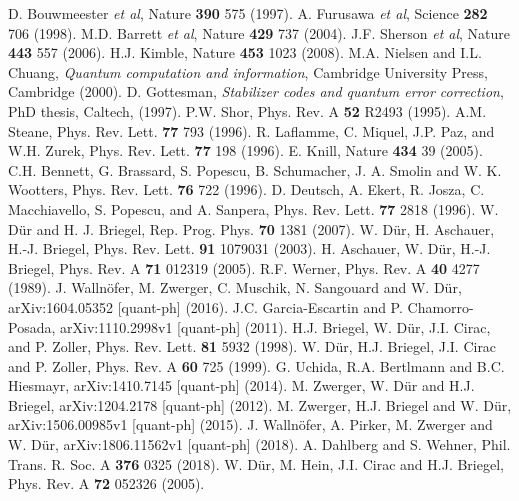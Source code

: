 \documentclass[10pt,a4paper]{book}
\numberwithin{equation}{chapter}
\numberwithin{figure}{chapter}
\numberwithin{table}{chapter}
\begin{document}
\begin{thebibliography}{99}
 D. Bouwmeester \textit{et al}, Nature \textbf{390} 575 (1997).
 A. Furusawa \textit{et al}, Science \textbf{282} 706 (1998).
 M.D. Barrett \textit{et al}, Nature \textbf{429} 737 (2004).
 J.F. Sherson \textit{et al}, Nature \textbf{443} 557 (2006).
 H.J. Kimble, Nature \textbf{453} 1023 (2008).
 M.A. Nielsen and I.L. Chuang, \textit{Quantum computation and information}, Cambridge University Press, Cambridge (2000).
 D. Gottesman, \textit{Stabilizer codes and quantum error correction}, PhD thesis, Caltech, (1997).
 P.W. Shor, Phys. Rev. A \textbf{52} R2493 (1995).
 A.M. Steane, Phys. Rev. Lett. \textbf{77} 793 (1996).
 R. Laflamme, C. Miquel, J.P. Paz, and W.H. Zurek, Phys. Rev. Lett. \textbf{77} 198 (1996).
 E. Knill, Nature \textbf{434} 39 (2005).
 C.H. Bennett, G. Brassard, S. Popescu, B. Schumacher, J. A. Smolin and W. K. Wootters, Phys. Rev. Lett. \textbf{76} 722 (1996).
 D. Deutsch, A. Ekert, R. Josza, C. Macchiavello, S. Popescu, and A. Sanpera, Phys. Rev. Lett. \textbf{77} 2818 (1996).
 W. Dür and H. J. Briegel, Rep. Prog. Phys. \textbf{70} 1381 (2007).
 W. Dür, H. Aschauer, H.-J. Briegel, Phys. Rev. Lett. \textbf{91} 1079031 (2003).
 H. Aschauer, W. Dür, H.-J. Briegel, Phys. Rev. A \textbf{71} 012319 (2005).
 R.F. Werner, Phys. Rev. A \textbf{40} 4277 (1989).
 J. Wallnöfer, M. Zwerger, C. Muschik, N. Sangouard and W. Dür, arXiv:1604.05352 [quant-ph] (2016).
 J.C. Garcia-Escartin and P. Chamorro-Posada, arXiv:1110.2998v1 [quant-ph] (2011).
 H.J. Briegel, W. Dür, J.I. Cirac, and P. Zoller, Phys. Rev. Lett. \textbf{81} 5932 (1998).
 W. Dür, H.J. Briegel, J.I. Cirac and P. Zoller, Phys. Rev. A \textbf{60} 725 (1999).
 G. Uchida, R.A. Bertlmann and B.C. Hiesmayr, arXiv:1410.7145 [quant-ph] (2014).
 M. Zwerger, W. Dür and H.J. Briegel, arXiv:1204.2178 [quant-ph] (2012).
 M. Zwerger, H.J. Briegel and W. Dür, arXiv:1506.00985v1 [quant-ph] (2015).
 J. Wallnöfer, A. Pirker, M. Zwerger and W. Dür, arXiv:1806.11562v1 [quant-ph] (2018).
 A. Dahlberg and S. Wehner, Phil. Trans. R. Soc. A \textbf{376} 0325 (2018).
 W. Dür, M. Hein, J.I. Cirac and H.J. Briegel, Phys. Rev. A \textbf{72} 052326 (2005).


\end{thebibliography}
\end{document}
